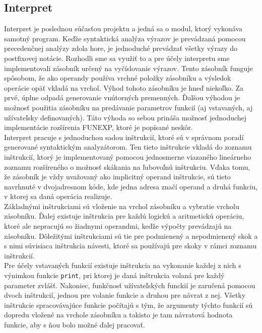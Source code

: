 \documentclass[12pt,a4paper,titlepage,final]{article}
\begin{document}
\subsection{Interpret}
Interpret je poslednou súčasťou projektu a jedná sa o modul, ktorý vykonáva samotný program. Keďže syntaktická analýza výrazov je prevádzaná pomocou precedenčnej analýzy zdola hore, je jednoduché prevádzať všetky výrazy do postfixovej notácie. Rozhodli sme sa využiť to a pre účely interpretu sme implementovali zásobník určený na vyčíslovanie výrazov. Tento zásobník funguje spôsobom, že ako operandy používa vrchné položky zásobníku a výsledok operácie opäť vkladá na vrchol. Výhod tohoto zásobníku je hneď niekoľko. Za prvé, úplne odpadá generovanie vnútorných premenných. Ďalšou výhodou je možnosť použitia zásobníku na predávanie parametrov funkcií (aj vstavaných, aj užívateľsky definovaných). Táto výhoda so sebou prináša možnosť jednoduchej implementácie rozšírenia FUNEXP, ktoré je popísané neskôr.\\
Interpret pracuje s jednoduchou sadou inštrukcií, ktoré sú v správnom poradí generované syntaktickým analyzátorom. Ten tieto inštrukcie vkladá do zoznamu inštrukcií, ktorý je implementovaný pomocou jednosmerne viazaného lineárneho zoznamu rozšíreného o možnosť skákania na ľubovoľnú inštrukciu. Vďaka tomu, že zásobník je vždy uvažovaný ako implicitný operand inštrukcie, sú tieto navrhnuté v dvojadresnom kóde, kde jedna adresa značí operand a druhá funkciu, v ktorej sa daná operácia realizuje.\\
Základnými inštrukciami sú vloženie na vrchol zásobníku a vybratie vrcholu zásobníku. Ďalej existuje inštrukcia pre každú logickú a aritmetickú operáciu, ktoré ale nepracujú so žiadnymi operandmi, keďže výpočty prevádzajú na zásobníku. Dôležitými inštrukciami sú tie pre podmienený a nepodmienený skok a s nimi súvisiaca inštrukcia návesti, ktoré sa používajú pre skoky v rámci zoznamu inštrukcií.\\
Pre účely vstavaných funkcií existuje inštrukcia na vykonanie každej z nich s výnimkou funkcie \texttt{print}, pri ktorej je daná inštrukcia volaná pre každý parameter zvlášť. Nakoniec, funkčnosť užívateľských funckií je zaručená pomocou dvoch inštrukcií, jednou pre volanie funkcie a druhou pre návrat z nej. Všetky inštrukcie spracovávajúce funkcie počítajú s tým, že argumenty týchto funkcií sú dopredu vložené na vrchole zásobníku a takisto je tam návratová hodnota funkcie, aby s ňou bolo možné ďalej pracovať.
\end{document}

